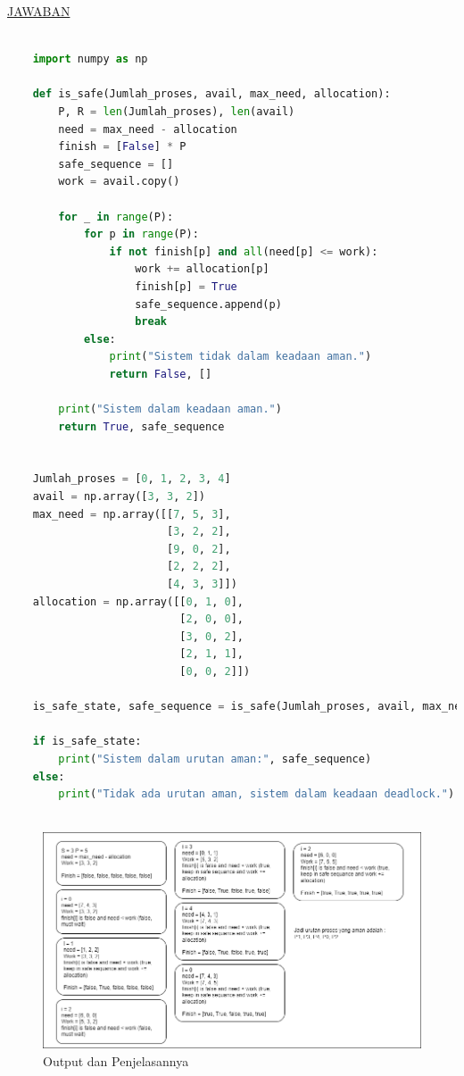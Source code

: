 \documentclass[12pt]{article}
\begin{document}
\begin{center}
    \underline{JAWABAN}
\end{center}

\begin{lstlisting}[language=Python]

    import numpy as np
    
    def is_safe(Jumlah_proses, avail, max_need, allocation):
        P, R = len(Jumlah_proses), len(avail) 
        need = max_need - allocation 
        finish = [False] * P 
        safe_sequence = []  
        work = avail.copy() 
    
        for _ in range(P):
            for p in range(P):
                if not finish[p] and all(need[p] <= work): 
                    work += allocation[p]
                    finish[p] = True
                    safe_sequence.append(p)
                    break
            else:
                print("Sistem tidak dalam keadaan aman.")
                return False, []
    
        print("Sistem dalam keadaan aman.")
        return True, safe_sequence
    
    
    Jumlah_proses = [0, 1, 2, 3, 4]
    avail = np.array([3, 3, 2]) 
    max_need = np.array([[7, 5, 3],
                         [3, 2, 2],
                         [9, 0, 2],
                         [2, 2, 2],
                         [4, 3, 3]]) 
    allocation = np.array([[0, 1, 0],
                           [2, 0, 0],
                           [3, 0, 2],
                           [2, 1, 1],
                           [0, 0, 2]]) 
    
    is_safe_state, safe_sequence = is_safe(Jumlah_proses, avail, max_need, allocation)
    
    if is_safe_state:
        print("Sistem dalam urutan aman:", safe_sequence)
    else:
        print("Tidak ada urutan aman, sistem dalam keadaan deadlock.")
    
\end{lstlisting}

\begin{figure}[H]
    \centering
    \includegraphics[width=1\linewidth]{asset/421.png}
    \caption{Output dan Penjelasannya}
\end{figure}
\end{document}
